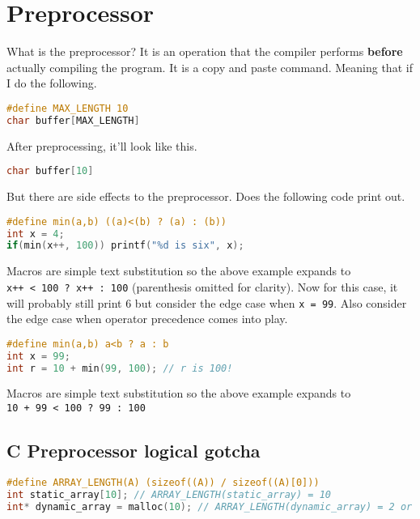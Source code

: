\section{Preprocessor}

What is the preprocessor? It is an operation that the compiler performs \textbf{before} actually compiling the program. It is a copy and paste command. Meaning that if I do the following.

\begin{lstlisting}[language=C]
#define MAX_LENGTH 10
char buffer[MAX_LENGTH]
\end{lstlisting}

After preprocessing, it'll look like this.

\begin{lstlisting}[language=C]
char buffer[10]
\end{lstlisting}

But there are side effects to the preprocessor. Does the following code print out.

\begin{lstlisting}[language=C]
#define min(a,b) ((a)<(b) ? (a) : (b))
int x = 4;
if(min(x++, 100)) printf("%d is six", x);
\end{lstlisting}

Macros are simple text substitution so the above example expands to \texttt{x++\ \textless{}\ 100\ ?\ x++\ :\ 100} (parenthesis omitted for clarity). Now for this case, it will probably still print 6 but consider the edge case when \texttt{x = 99}. Also consider the edge case when operator precedence comes into play.

\begin{lstlisting}[language=C]
#define min(a,b) a<b ? a : b
int x = 99;
int r = 10 + min(99, 100); // r is 100!
\end{lstlisting}

Macros are simple text substitution so the above example expands to \texttt{10\ +\ 99\ \textless{}\ 100\ ?\ 99\ :\ 100}

\subsection{C Preprocessor logical gotcha}\label{c-preprocessor-logical-gotcha}

\begin{lstlisting}[language=C]
#define ARRAY_LENGTH(A) (sizeof((A)) / sizeof((A)[0]))
int static_array[10]; // ARRAY_LENGTH(static_array) = 10
int* dynamic_array = malloc(10); // ARRAY_LENGTH(dynamic_array) = 2 or 1
\end{lstlisting}

